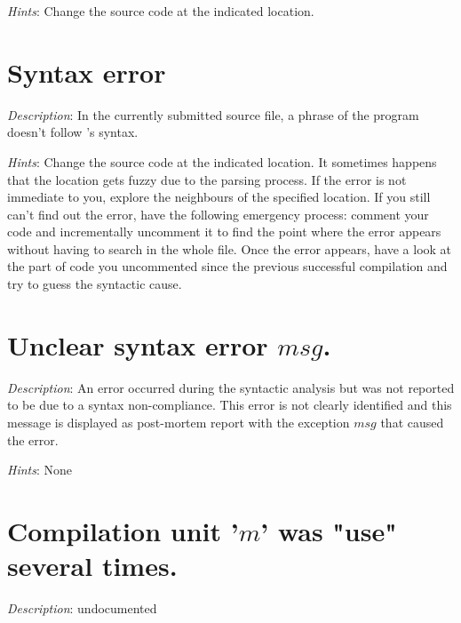 {\em Hints}: Change the source code at the indicated location.



\section*{Syntax error}
{\em Description}: In the currently submitted source file, a phrase of
the program doesn't follow \focal's syntax.

{\em Hints}: Change the source code at the indicated location. It
sometimes happens that the location gets fuzzy due to the parsing
process. If the error is not immediate to you, explore the neighbours of
 the specified location. If you still can't find out the error,
have the following emergency process: comment your code and
incrementally uncomment it to find the point where the error appears
without having to search in the whole file. Once the error appears,
have a look at the part of code you uncommented since the previous
successful compilation and try to guess the syntactic cause.



\section*{Unclear syntax error $msg$.}
{\em Description}: An error occurred during the syntactic analysis but
was not reported to be due to a syntax non-compliance. This error is
not clearly identified and this message is displayed as post-mortem
report with the exception $msg$ that caused the error.

{\em Hints}: None



\section*{Compilation unit '$m$' was "use" several times.}
{\em Description}: undocumented





